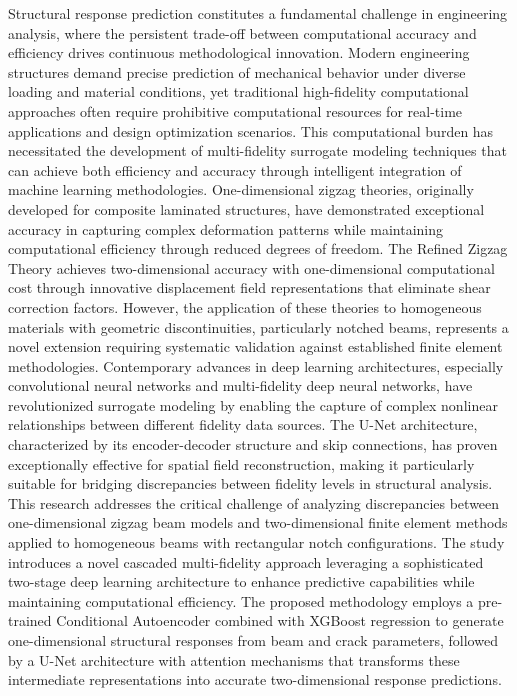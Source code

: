 \documentclass[12pt,a4paper]{report}
\begin{document}
Structural response prediction constitutes a fundamental challenge in engineering analysis, where the persistent trade-off between computational accuracy and efficiency drives continuous methodological innovation. Modern engineering structures demand precise prediction of mechanical behavior under diverse loading and material conditions, yet traditional high-fidelity computational approaches often require prohibitive computational resources for real-time applications and design optimization scenarios. This computational burden has necessitated the development of multi-fidelity surrogate modeling techniques that can achieve both efficiency and accuracy through intelligent integration of machine learning methodologies.
One-dimensional zigzag theories, originally developed for composite laminated structures, have demonstrated exceptional accuracy in capturing complex deformation patterns while maintaining computational efficiency through reduced degrees of freedom. The Refined Zigzag Theory achieves two-dimensional accuracy with one-dimensional computational cost through innovative displacement field representations that eliminate shear correction factors. However, the application of these theories to homogeneous materials with geometric discontinuities, particularly notched beams, represents a novel extension requiring systematic validation against established finite element methodologies.
Contemporary advances in deep learning architectures, especially convolutional neural networks and multi-fidelity deep neural networks, have revolutionized surrogate modeling by enabling the capture of complex nonlinear relationships between different fidelity data sources. The U-Net architecture, characterized by its encoder-decoder structure and skip connections, has proven exceptionally effective for spatial field reconstruction, making it particularly suitable for bridging discrepancies between fidelity levels in structural analysis.
This research addresses the critical challenge of analyzing discrepancies between one-dimensional zigzag beam models and two-dimensional finite element methods applied to homogeneous beams with rectangular notch configurations. The study introduces a novel cascaded multi-fidelity approach leveraging a sophisticated two-stage deep learning architecture to enhance predictive capabilities while maintaining computational efficiency. The proposed methodology employs a pre-trained Conditional Autoencoder combined with XGBoost regression to generate one-dimensional structural responses from beam and crack parameters, followed by a U-Net architecture with attention mechanisms that transforms these intermediate representations into accurate two-dimensional response predictions.
\end{document}
